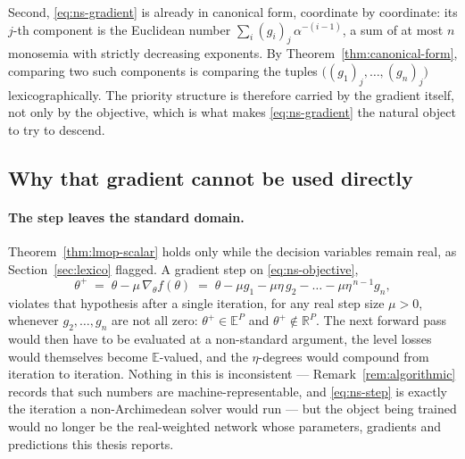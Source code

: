 Second, \eqref{eq:ns-gradient} is already in canonical form, coordinate by
coordinate: its $j$-th component is the Euclidean number
$\sum_{i} (g_i)_j\,\alpha^{-(i-1)}$, a sum of at most $n$ monosemia with strictly
decreasing exponents. By Theorem~\ref{thm:canonical-form}, comparing two such
components is comparing the tuples $\big((g_1)_j,\dots,(g_n)_j\big)$
lexicographically. The priority structure is therefore carried by the gradient
itself, not only by the objective, which is what makes \eqref{eq:ns-gradient} the
natural object to try to descend.

\subsection{Why that gradient cannot be used directly}
\label{ssec:nsa-why-not}

\paragraph{The step leaves the standard domain.}
Theorem~\ref{thm:lmop-scalar} holds only while the decision variables remain real, as
Section~\ref{sec:lexico} flagged. A gradient step on \eqref{eq:ns-objective},
\begin{equation}
  \label{eq:ns-step}
  \theta^{+}
  \;=\; \theta - \mu\,\nabla_\theta f(\theta)
  \;=\; \theta - \mu g_1 - \mu\eta\,g_2 - \dots - \mu\eta^{\,n-1} g_n ,
\end{equation}
violates that hypothesis after a single iteration, for any real step size $\mu>0$,
whenever $g_2,\dots,g_n$ are not all zero: $\theta^{+} \in \mathbb{E}^{P}$ and
$\theta^{+} \notin \mathbb{R}^{P}$. The next forward pass would then have to be
evaluated at a non-standard argument, the level losses would themselves become
$\mathbb{E}$-valued, and the $\eta$-degrees would compound from iteration to
iteration. Nothing in this is inconsistent --- Remark~\ref{rem:algorithmic} records
that such numbers are machine-representable, and \eqref{eq:ns-step} is exactly the
iteration a non-Archimedean solver would run --- but the object being trained would
no longer be the real-weighted network whose parameters, gradients and predictions
this thesis reports.

